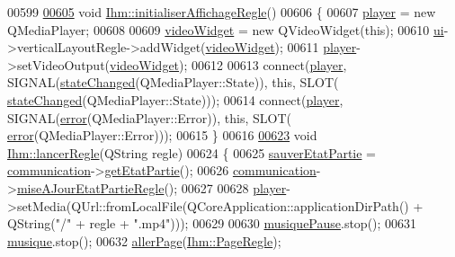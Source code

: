 \begin{DoxyCode}
00599 
\hyperlink{class_ihm_a97b1938c38eef2427b5cf2326feeef3d}{00605} \textcolor{keywordtype}{void} \hyperlink{class_ihm_a97b1938c38eef2427b5cf2326feeef3d}{Ihm::initialiserAffichageRegle}()
00606 \{
00607     \hyperlink{class_ihm_a633230fb15d587e647ad9d2d6142ebc3}{player} = \textcolor{keyword}{new} QMediaPlayer;
00608 
00609     \hyperlink{class_ihm_a011827612654af9b19bc8c42045e3c06}{videoWidget} = \textcolor{keyword}{new} QVideoWidget(\textcolor{keyword}{this});
00610     \hyperlink{class_ihm_a0ac5f47856566ceeeca1720109bf70ea}{ui}->verticalLayoutRegle->addWidget(\hyperlink{class_ihm_a011827612654af9b19bc8c42045e3c06}{videoWidget});
00611     \hyperlink{class_ihm_a633230fb15d587e647ad9d2d6142ebc3}{player}->setVideoOutput(\hyperlink{class_ihm_a011827612654af9b19bc8c42045e3c06}{videoWidget});
00612 
00613     connect(\hyperlink{class_ihm_a633230fb15d587e647ad9d2d6142ebc3}{player}, SIGNAL(\hyperlink{class_ihm_a3c815827527ca8f9c586e001e8e95721}{stateChanged}(QMediaPlayer::State)), \textcolor{keyword}{this}, SLOT(
      \hyperlink{class_ihm_a3c815827527ca8f9c586e001e8e95721}{stateChanged}(QMediaPlayer::State)));
00614     connect(\hyperlink{class_ihm_a633230fb15d587e647ad9d2d6142ebc3}{player}, SIGNAL(\hyperlink{class_ihm_a28b5dd043c4d752bb944110d8d8457aa}{error}(QMediaPlayer::Error)), \textcolor{keyword}{this}, SLOT(
      \hyperlink{class_ihm_a28b5dd043c4d752bb944110d8d8457aa}{error}(QMediaPlayer::Error)));
00615 \}
00616 
\hyperlink{class_ihm_a5186bc159a8bf1fa359da4f4ccd78f5a}{00623} \textcolor{keywordtype}{void} \hyperlink{class_ihm_a5186bc159a8bf1fa359da4f4ccd78f5a}{Ihm::lancerRegle}(QString regle)
00624 \{
00625     \hyperlink{class_ihm_a1a9d23dd4defa0b88d1e4a56ce807e45}{sauverEtatPartie} = \hyperlink{class_ihm_a2f3d4781795781a840786cd8c2233899}{communication}->\hyperlink{class_communication_a977495ad03ddf275aae49184c9a0dd1a}{getEtatPartie}();
00626     \hyperlink{class_ihm_a2f3d4781795781a840786cd8c2233899}{communication}->\hyperlink{class_communication_a01a86890468a8ecfb900bf15dcab92f2}{miseAJourEtatPartieRegle}();
00627 
00628     \hyperlink{class_ihm_a633230fb15d587e647ad9d2d6142ebc3}{player}->setMedia(QUrl::fromLocalFile(QCoreApplication::applicationDirPath() + QString(\textcolor{stringliteral}{"/"} + regle
       + \textcolor{stringliteral}{".mp4"})));
00629 
00630     \hyperlink{class_ihm_a11e7ae529b6adb7ac98f1aa512172ff2}{musiquePause}.stop();
00631     \hyperlink{class_ihm_a6e2a173ec36ee846d6210117b4b85fa8}{musique}.stop();
00632     \hyperlink{class_ihm_a52bf0bd258d00a16d3e1037a9288948b}{allerPage}(\hyperlink{class_ihm_a472c7a7bec7e6e0230842f78ace4833eaeb2ec486b2e880de96d76609d12c36af}{Ihm::PageRegle});

\end{DoxyCode}
